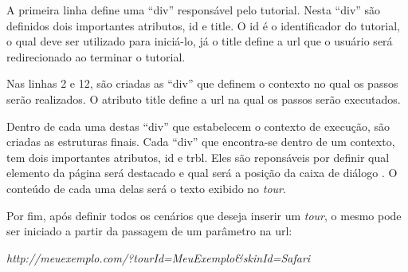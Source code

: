 A primeira linha define uma ``div'' responsável pelo tutorial. Nesta ``div'' são definidos dois importantes atributos, id e title. O id é o identificador do tutorial, o qual deve ser utilizado para iniciá-lo, já o title define a url que o usuário será redirecionado ao terminar o tutorial.

Nas linhas 2 e 12, são criadas as ``div'' que definem o contexto no qual os passos serão realizados. O atributo title define a url na qual os passos serão executados.

Dentro de cada uma destas ``div'' que estabelecem o contexto de execução, são criadas as estruturas finais. Cada ``div'' que encontra-se dentro de um contexto, tem dois importantes atributos, id e trbl. Eles são reponsáveis por definir qual elemento da página será destacado e qual será a posição da caixa de diálogo \cite{AJ}. O conteúdo de cada uma delas será o texto exibido no \textit{tour}.

Por fim, após definir todos os cenários que deseja inserir um \textit{tour}, o mesmo pode ser iniciado a partir da passagem de um parâmetro na url:

\begin{center}
\textit{http://meuexemplo.com/?tourId=MeuExemplo\&skinId=Safari}
\end{center}